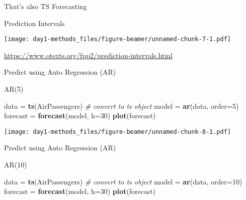 \documentclass[ignorenonframetext,]{beamer}
\newenvironment{Shaded}{\begin{snugshade}}{\end{snugshade}}
\newcommand{\KeywordTok}[1]{\textcolor[rgb]{0.13,0.29,0.53}{\textbf{#1}}}
\newcommand{\DataTypeTok}[1]{\textcolor[rgb]{0.13,0.29,0.53}{#1}}
\newcommand{\DecValTok}[1]{\textcolor[rgb]{0.00,0.00,0.81}{#1}}
\newcommand{\StringTok}[1]{\textcolor[rgb]{0.31,0.60,0.02}{#1}}
\newcommand{\CommentTok}[1]{\textcolor[rgb]{0.56,0.35,0.01}{\textit{#1}}}
\newcommand{\NormalTok}[1]{#1}
\begin{document}
\begin{frame}[fragile]{That's also TS Forecasting}

\begin{block}{Prediction Intervals}

\texttt{[image: day1-methods\_files/figure-beamer/unnamed-chunk-7-1.pdf]}

\url{https://www.otexts.org/fpp2/prediction-intervals.html}

\end{block}

\begin{block}{Predict using Auto Regression (AR)}

\begin{block}{AR(5)}

\begin{Shaded}
\begin{Highlighting}[]
\NormalTok{data =}\StringTok{ }\KeywordTok{ts}\NormalTok{(AirPassengers) }\CommentTok{# convert to ts object}
\NormalTok{model =}\StringTok{ }\KeywordTok{ar}\NormalTok{(data, }\DataTypeTok{order=}\DecValTok{5}\NormalTok{)}
\NormalTok{forecast =}\StringTok{ }\KeywordTok{forecast}\NormalTok{(model, }\DataTypeTok{h=}\DecValTok{30}\NormalTok{)}
\KeywordTok{plot}\NormalTok{(forecast)}
\end{Highlighting}
\end{Shaded}

\texttt{[image: day1-methods\_files/figure-beamer/unnamed-chunk-8-1.pdf]}

\end{block}

\end{block}

\begin{block}{Predict using Auto Regression (AR)}

\begin{block}{AR(10)}

\begin{Shaded}
\begin{Highlighting}[]
\NormalTok{data =}\StringTok{ }\KeywordTok{ts}\NormalTok{(AirPassengers) }\CommentTok{# convert to ts object}
\NormalTok{model =}\StringTok{ }\KeywordTok{ar}\NormalTok{(data, }\DataTypeTok{order=}\DecValTok{10}\NormalTok{)}
\NormalTok{forecast =}\StringTok{ }\KeywordTok{forecast}\NormalTok{(model, }\DataTypeTok{h=}\DecValTok{30}\NormalTok{)}
\KeywordTok{plot}\NormalTok{(forecast)}
\end{Highlighting}
\end{Shaded}


\end{block}
\end{block}
\end{frame}
\end{document}
